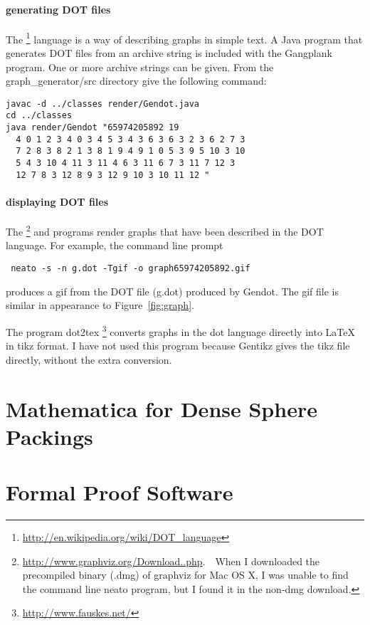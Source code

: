 \subsubsection{generating DOT files}

The %
\footnote{\url{http://en.wikipedia.org/wiki/DOT_language}} %
 language is a way of describing graphs in simple text.
A Java program that generates DOT files from an archive string is included
with the Gangplank program.  One or more archive strings can be given.
From the graph\_generator/src
directory give the following command:

\begin{verbatim}
javac -d ../classes render/Gendot.java 
cd ../classes
java render/Gendot "65974205892 19 
  4 0 1 2 3 4 0 3 4 5 3 4 3 6 3 6 3 2 3 6 2 7 3 
  7 2 8 3 8 2 1 3 8 1 9 4 9 1 0 5 3 9 5 10 3 10 
  5 4 3 10 4 11 3 11 4 6 3 11 6 7 3 11 7 12 3 
  12 7 8 3 12 8 9 3 12 9 10 3 10 11 12 "
\end{verbatim}


\subsubsection{displaying DOT files}


The %
\footnote{\url{http://www.graphviz.org/Download..php}.\ \    When I downloaded the precompiled binary (.dmg) of graphviz for Mac OS X, I was unable to find the command line neato program, but I found it in the non-dmg download.} %
and  programs render graphs that have been described in the DOT language.
For example,  the command line prompt
%
\begin{verbatim}
 neato -s -n g.dot -Tgif -o graph65974205892.gif
\end{verbatim}
%
produces a gif from the DOT file (g.dot) produced by Gendot.  The gif file is
similar in  appearance
to Figure~\ref{fig:graph}.


The program dot2tex%
\footnote{\url{http://www.fauskes.net/}} %
converts graphs in the dot language directly into
LaTeX in tikz format.  I have not used this program because Gentikz gives
the tikz file directly, without the extra conversion.




\chapter{Mathematica for Dense Sphere Packings}

\chapter{Formal Proof Software}

